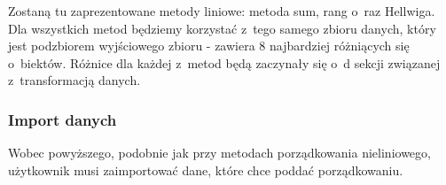 \documentclass[12pt,a4paper]{report}
\begin{document}
{Zostaną tu zaprezentowane metody liniowe: metoda sum, rang o~raz Hellwiga. Dla wszystkich metod będziemy korzystać z~tego samego zbioru danych, który jest podzbiorem wyjściowego zbioru - zawiera 8 najbardziej różniących się o~biektów. Różnice dla każdej z~metod będą zaczynały się o~d sekcji związanej z~transformacją danych. 

\subsubsection{Import danych}\label{import-danych}
Wobec powyższego, podobnie jak przy metodach porządkowania nieliniowego, użytkownik musi zaimportować dane, które chce poddać porządkowaniu. 


\begin{Shaded}
\begin{Highlighting}[]
\StringTok{ }\NormalTok{(}\NormalTok{, }
                            \NormalTok{, } \NormalTok{(}\NormalTok{,}\NormalTok{, }
                           \NormalTok{, }\NormalTok{, }\NormalTok{, }\NormalTok{,                                                                              }\NormalTok{,}\NormalTok{, }\NormalTok{, }\NormalTok{, }
                              \NormalTok{, }\NormalTok{, }\NormalTok{,  }\NormalTok{, }
                              \NormalTok{, }\NormalTok{, }\NormalTok{, }\NormalTok{,}\NormalTok{, }
                                  \NormalTok{, }\NormalTok{, }\NormalTok{, }\NormalTok{, }
                                   \NormalTok{, }\NormalTok{, }\NormalTok{,                                                                              }\NormalTok{, }
                                   \NormalTok{, }\NormalTok{, }\NormalTok{))}
\end{Highlighting}
\end{Shaded}



}
\end{document}
